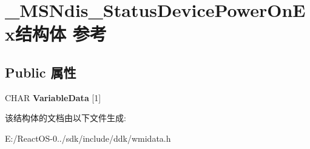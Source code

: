 \hypertarget{struct___m_s_ndis___status_device_power_on_ex}{}\section{\+\_\+\+M\+S\+Ndis\+\_\+\+Status\+Device\+Power\+On\+Ex结构体 参考}
\label{struct___m_s_ndis___status_device_power_on_ex}
\subsection*{Public 属性}
\begin{DoxyCompactItemize}
\item 
\mbox{\label{struct___m_s_ndis___status_device_power_on_ex_a8217e9331286d297b8608f09d5ba9cc9}} 
C\+H\+AR {\bfseries Variable\+Data} \mbox{[}1\mbox{]}
\end{DoxyCompactItemize}


该结构体的文档由以下文件生成\+:\begin{DoxyCompactItemize}
\item 
E\+:/\+React\+O\+S-\/0../sdk/include/ddk/wmidata.\+h\end{DoxyCompactItemize}
